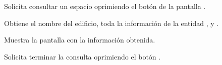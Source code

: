 \begin{UCtrayectoria}
	\UCpaso [\UCactor] Solicita consultar un espacio oprimiendo el botón  de la pantalla . 
	
	\UCpaso[\UCsist] Obtiene el nombre del edificio, toda la información de la entidad ,  y .
	
	\UCpaso[\UCsist] Muestra la pantalla  con la información obtenida.
	
	\UCpaso [\UCactor] Solicita terminar la consulta oprimiendo el botón . 
\end{UCtrayectoria}